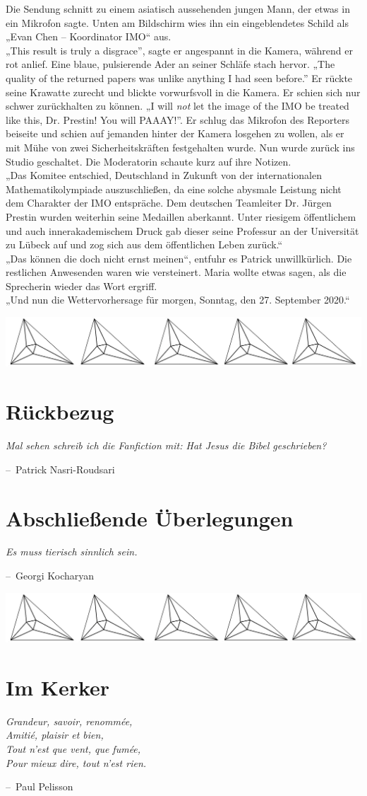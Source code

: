 \documentclass[oneside]{memoir}
\makeatletter
\newcommand{\parasep}{
\bigskip
\bigskip
\begin{center} 
   \includegraphics[scale=.08]{parasep5.jpg} 
\end{center}
\bigskip
\bigskip
}
\newenvironment{chapquote}[2][2em]
  {\setlength{\@tempdima}{#1}%
   \def\chapquote@author{#2}%
   \parshape 1 \@tempdima \dimexpr\textwidth-2\@tempdima\relax%
   \itshape}
  {\par\normalfont\hfill--\ \chapquote@author\hspace*{\@tempdima}\par\bigskip}
\makeatother
\begin{document}
Die Sendung schnitt zu einem asiatisch aussehenden jungen Mann, der etwas in ein Mikrofon sagte. Unten am Bildschirm wies ihn ein eingeblendetes Schild als „Evan Chen – Koordinator IMO“ aus. \\
„This result is truly a disgrace”, sagte er angespannt in die Kamera, während er rot anlief. Eine blaue, pulsierende Ader an seiner Schläfe stach hervor. „The quality of the returned papers was unlike anything I had seen before.” Er rückte seine Krawatte zurecht und blickte vorwurfsvoll in die Kamera. Er schien sich nur schwer zurückhalten zu können. „I will \textit{not} let the image of the IMO be treated like this, Dr. Prestin! You will PAAAY!”. Er schlug das Mikrofon des Reporters beiseite und schien auf jemanden hinter der Kamera losgehen zu wollen, als er mit Mühe von zwei Sicherheitskräften festgehalten wurde. Nun wurde zurück ins Studio geschaltet. Die Moderatorin schaute kurz auf ihre Notizen. \\
„Das Komitee entschied, Deutschland in Zukunft von der internationalen Mathematikolympiade auszuschließen, da eine solche abysmale Leistung nicht dem Charakter der IMO entspräche. Dem deutschen Teamleiter Dr. Jürgen Prestin wurden weiterhin seine Medaillen aberkannt. Unter riesigem öffentlichem und auch innerakademischem Druck gab dieser seine Professur an der Universität zu Lübeck auf und zog sich aus dem öffentlichen Leben zurück.“ \\
„Das können die doch nicht ernst meinen“, entfuhr es Patrick unwillkürlich. Die restlichen Anwesenden waren wie versteinert. Maria wollte etwas sagen, als die Sprecherin wieder das Wort ergriff. \\
„Und nun die Wettervorhersage für morgen, Sonntag, den 27. September 2020.“

     
     \parasep

\chapter{Rückbezug} %
\begin{chapquote}{Patrick Nasri-Roudsari}
\glqq Mal sehen schreib ich die Fanfiction mit: Hat Jesus die Bibel geschrieben?\grqq
\end{chapquote}

\chapter{Abschließende Überlegungen} %
\begin{chapquote}{Georgi Kocharyan}
\glqq Es muss tierisch sinnlich sein.\grqq
\end{chapquote}


\parasep
     
     
\chapter{Im Kerker} %
\begin{chapquote}{Paul Pelisson}
\glqq Grandeur, savoir, renommée, \\
Amitié, plaisir et bien, \\
Tout n’est que vent, que fumée, \\
Pour mieux dire, tout n’est rien. 
\grqq
\end{chapquote}
\end{document}
